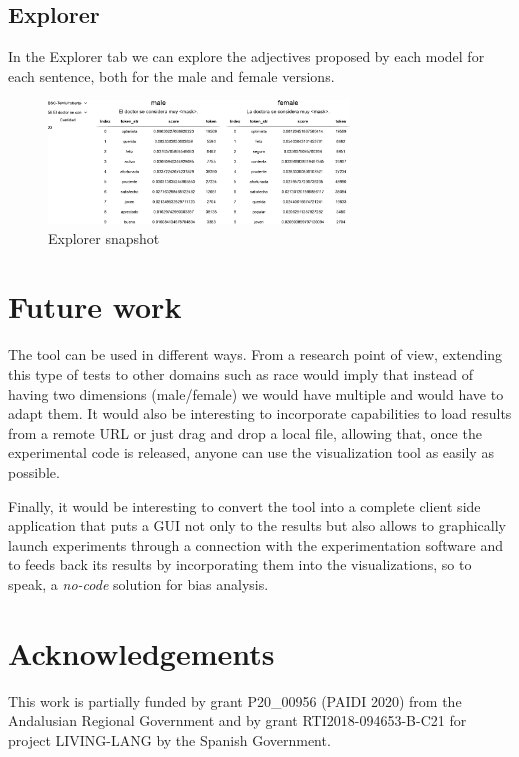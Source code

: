 \documentclass[
twocolumn,
]{ceurart}
\begin{document}
\subsection{Explorer}
In the Explorer tab we can explore the adjectives proposed by each model for each sentence, both for the male and female versions.

\begin{figure}[htp]
    \centering
    \includegraphics[width=8cm]{pics/f4}
    \caption{Explorer snapshot}
    \label{fig:explorer}
\end{figure}

\section{Future work}

The tool can be used in different ways. From a research point of view, extending this type of tests to other domains such as race would imply that instead of having two dimensions (male/female) we would have multiple and would have to adapt them. It would also be interesting to incorporate capabilities to load results from a remote URL or just drag and drop a local file, allowing that, once the experimental code is released, anyone can use the visualization tool as easily as possible.

Finally, it would be interesting to convert the tool into a complete client side application that puts a GUI not only to the results but also allows to graphically launch experiments through a connection with the experimentation software and to feeds back its results by incorporating them into the visualizations, so to speak, a \emph{no-code} solution for bias analysis.

\section{Acknowledgements}

This work is partially funded by grant P20\_00956 (PAIDI 2020) from the Andalusian Regional Government and by grant RTI2018-094653-B-C21 for project LIVING-LANG by the Spanish Government.


\end{document}

